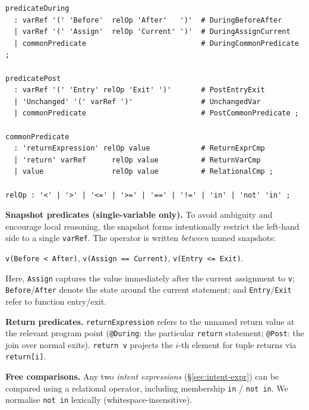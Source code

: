 \documentclass[pdflatex,sn-basic]{sn-jnl}%
\theoremstyle{thmstyleone}%
\theoremstyle{thmstyletwo}%
\theoremstyle{thmstylethree}%
\begin{document}
\begin{lstlisting}[basicstyle=\scriptsize\ttfamily,frame=single]
predicateDuring
  : varRef '(' 'Before'  relOp 'After'   ')'  # DuringBeforeAfter
  | varRef '(' 'Assign'  relOp 'Current' ')'  # DuringAssignCurrent
  | commonPredicate                           # DuringCommonPredicate ;

predicatePost
  : varRef '(' 'Entry' relOp 'Exit' ')'       # PostEntryExit
  | 'Unchanged' '(' varRef ')'                # UnchangedVar
  | commonPredicate                           # PostCommonPredicate ;

commonPredicate
  : 'returnExpression' relOp value            # ReturnExprCmp
  | 'return' varRef      relOp value          # ReturnVarCmp
  | value                relOp value          # RelationalCmp ;

relOp : '<' | '>' | '<=' | '>=' | '==' | '!=' | 'in' | 'not' 'in' ;
\end{lstlisting}

\noindent
\textbf{Snapshot predicates (single-variable only).}
To avoid ambiguity and encourage local reasoning, the snapshot
forms intentionally restrict the left-hand side to a single
\texttt{varRef}.  The operator is written \emph{between} named
snapshots:
\begin{center}
\verb|v(Before < After)|,\quad
\verb|v(Assign == Current)|,\quad
\verb|v(Entry <= Exit)|.
\end{center}
Here, \texttt{Assign} captures the value immediately after the
current assignment to \texttt{v}; \texttt{Before}/\texttt{After}
denote the state around the current statement; and
\texttt{Entry}/\texttt{Exit} refer to function entry/exit.

\noindent
\textbf{Return predicates.}
\verb|returnExpression| refers to the unnamed return value at the
relevant program point (\texttt{@During}: the particular \texttt{return}
statement; \texttt{@Post}: the join over normal exits).
\verb|return v| projects the $i$-th element for tuple returns via
\verb|return[i]|.

\noindent
\textbf{Free comparisons.}
Any two \emph{intent expressions} (\S\ref{sec:intent-expr}) can be
compared using a relational operator, including membership
\verb|in| / \verb|not in|.
We normalise \verb|not in| lexically (whitespace-insensitive).

\end{document}
